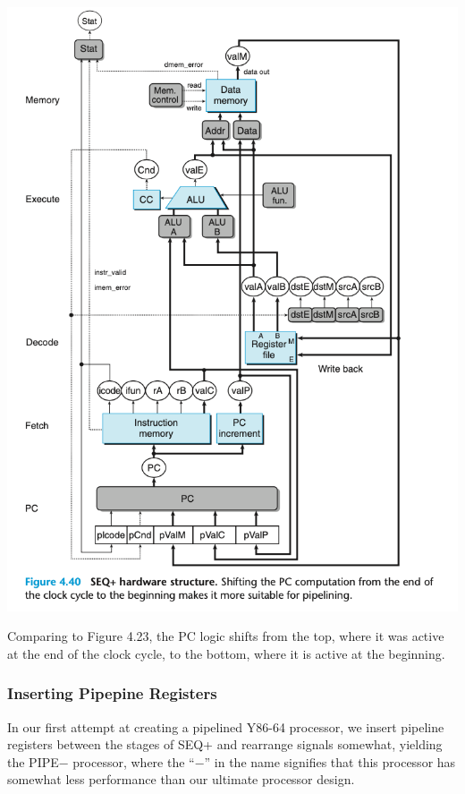 \documentclass[11pt]{article}
\begin{document}
\begin{center}
\includegraphics[width=.9\linewidth]{pics/figure4.40-seq+-hardware-structure.png}
\end{center}

Comparing to Figure 4.23, the PC logic shifts from the top, where it was active at the end of the clock cycle, to the bottom, where it is active at the beginning.\\

\subsubsection{Inserting Pipepine Registers}
\label{sec:orgebc2f68}

In our first attempt at creating a pipelined Y86-64 processor, we insert pipeline registers between the stages of SEQ+ and rearrange signals somewhat, yielding the PIPE− processor, where the “−” in the name signifies that this processor has somewhat less performance than our ultimate processor design.\\
\end{document}

